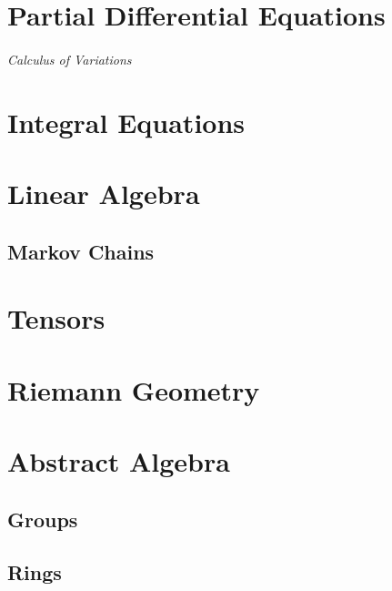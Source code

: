\documentclass[12pt, english]{book}
\begin{document}
	
	\part{Partial Differential Equations} \label{Partial Differential Equations Part}
	
	\paragraph{Calculus of Variations} \label{Calculus of Variations Part}
	
	\part{Integral Equations} \label{Integral Equations Part}
	
	
	\part{Linear Algebra} \label{Linear Algebra Part}
	
	\chapter{Markov Chains} \label{Markov Chains Chapter - Linear Algebra}
	
	
	\part{Tensors} \label{Tensors Part}
	
	
	\part{Riemann Geometry} \label{Reimann Geometry Part}
	
	
	\part{Abstract Algebra} \label{Abstract Algebra Part}
	
	\chapter{Groups} \label{Groups Chapter - Abstract Algebra}
	
	
	\chapter{Rings} \label{Rings Chapter - Abstract Algebra}
	
\end{document}
